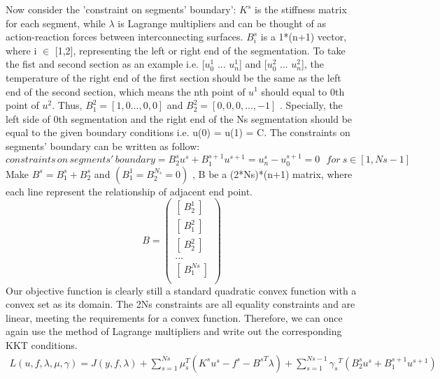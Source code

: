 \documentclass{article}
\begin{document}
    Now consider the 'constraint on segments' boundary': $K^s$ is the stiffness matrix for each segment, while $\lambda$ is Lagrange multipliers and can be thought of as action-reaction forces between interconnecting surfaces. $B^s_i$ is a 1*(n+1) vector, where i $\in$ [1,2], representing the left or right end of the segmentation. To take the fist and second section as an example i.e. [$u^1_0$ ... $u^1_n$] and [$u^2_0$ ... $u^2_n$], the temperature of the right end of the first section should be the same as the left end of the second section, which means the nth point of $u^1$ should equal to 0th point of $u^2$. Thus, $B^2_1=[1,0...,0,0]$ and $B^2_2 = [0,0,0,...,-1]$ . Specially, the left side of 0th segmentation and the right end of the Ns segmentation should be equal to the given boundary conditions i.e. u(0) = u(1) = C. The constraints on segments' boundary can be written as follow:
    \begin{equation}
    constraints\, on\, segments' \,boundary = 
            B^s_2u^s+B^{s+1}_{1}u^{s+1}=u^s_n-u^{s+1}_0=0 \:\:\: for\: s \in [1,Ns-1]
    \end{equation}
    Make $B^s=B^s_1+B^s_2$ and $(B^1_1=B^{N_s}_2=0)$ , B be a (2*Ns)*(n+1) matrix, where each line represent the relationship of adjacent end point.
    \begin{equation}
    B = 
        \begin{pmatrix}
            [\:B^1_2\:]\\
            [\:B^2_1\:]\\
            [\:B^2_2\:]\\
            ...\\
            [\:B^{Ns}_1\:]\\
        \end{pmatrix}
    \end{equation}
    Our objective function is clearly still a standard quadratic convex function with a convex set as its domain. The 2Ns constraints are all equality constraints and are linear, meeting the requirements for a convex function. Therefore, we can once again use the method of Lagrange multipliers and write out the corresponding KKT conditions.
    \begin{multline}
        L(u,f,\lambda,\mu,\gamma) = J(y,f,\lambda)+\sum_{s=1}^{Ns}\mu_s^T(K^su^s-f^s-{B^s}^T\lambda)+\sum_{s=1}^{Ns-1}{\gamma_s}^T(B^s_2 u^s+B^{s+1}_1u^{s+1})%
    \end{multline}
\end{document}
